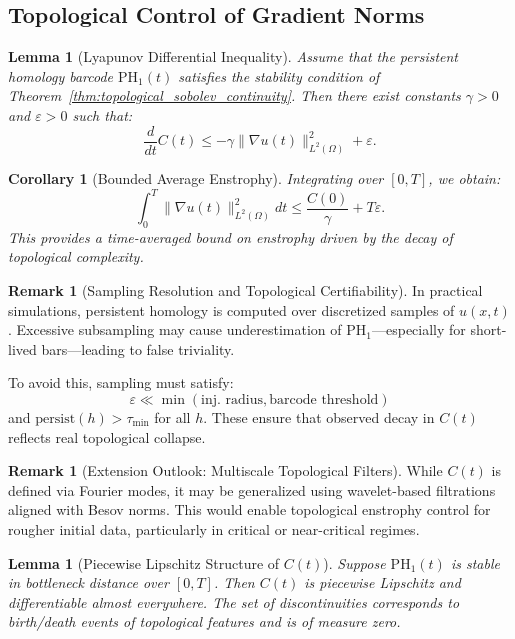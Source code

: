 \documentclass[11pt]{article}
\newtheorem{lemma}[theorem]{Lemma}
\newtheorem{corollary}[theorem]{Corollary}
\theoremstyle{definition}
\newtheorem{remark}[theorem]{Remark}
\begin{document}
\subsection{Topological Control of Gradient Norms}

\begin{lemma}[Lyapunov Differential Inequality]
Assume that the persistent homology barcode $\mathrm{PH}_1(t)$ satisfies the stability condition of Theorem~\ref{thm:topological_sobolev_continuity}. Then there exist constants $\gamma > 0$ and $\varepsilon > 0$ such that:
\[
\frac{d}{dt} C(t) \leq -\gamma \|\nabla u(t)\|_{L^2(\Omega)}^2 + \varepsilon.
\]
\end{lemma}

\begin{corollary}[Bounded Average Enstrophy]
Integrating over $[0,T]$, we obtain:
\[
\int_0^T \|\nabla u(t)\|_{L^2(\Omega)}^2 dt \leq \frac{C(0)}{\gamma} + T\varepsilon.
\]
This provides a time-averaged bound on enstrophy driven by the decay of topological complexity.
\end{corollary}

\begin{remark}[Sampling Resolution and Topological Certifiability]
In practical simulations, persistent homology is computed over discretized samples of $u(x,t)$. Excessive subsampling may cause underestimation of $\mathrm{PH}_1$—especially for short-lived bars—leading to false triviality.

To avoid this, sampling must satisfy:
\[ \varepsilon \ll \min(\text{inj. radius},\text{barcode threshold}) \]
and $\mathrm{persist}(h) > \tau_\text{min}$ for all $h$. These ensure that observed decay in $C(t)$ reflects real topological collapse.
\end{remark}

\begin{remark}[Extension Outlook: Multiscale Topological Filters]
While $C(t)$ is defined via Fourier modes, it may be generalized using wavelet-based filtrations aligned with Besov norms. This would enable topological enstrophy control for rougher initial data, particularly in critical or near-critical regimes.
\end{remark}

\begin{lemma}[Piecewise Lipschitz Structure of $C(t)$]
Suppose $\mathrm{PH}_1(t)$ is stable in bottleneck distance over $[0,T]$. Then $C(t)$ is piecewise Lipschitz and differentiable almost everywhere. The set of discontinuities corresponds to birth/death events of topological features and is of measure zero.
\end{lemma}
\end{document}

